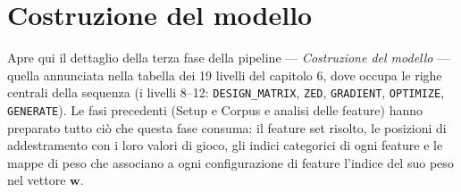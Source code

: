 %
%
%
%
%
%
%
%

%

\chapter{Costruzione del modello}

Apre qui il dettaglio della terza fase della pipeline — \emph{Costruzione del
modello} — quella annunciata nella tabella dei 19 livelli del capitolo 6,
dove occupa le righe centrali della sequenza (i livelli 8–12:
\texttt{DESIGN\_MATRIX}, \texttt{ZED}, \texttt{GRADIENT}, \texttt{OPTIMIZE},
\texttt{GENERATE}). Le fasi precedenti
(Setup e Corpus e analisi delle feature) hanno preparato tutto ciò che questa
fase consuma: il feature set risolto, le posizioni di addestramento con i loro
valori di gioco, gli indici categorici di ogni feature e le mappe di peso
che associano a ogni configurazione di feature l'indice del suo peso nel
vettore $\bm{w}$.

